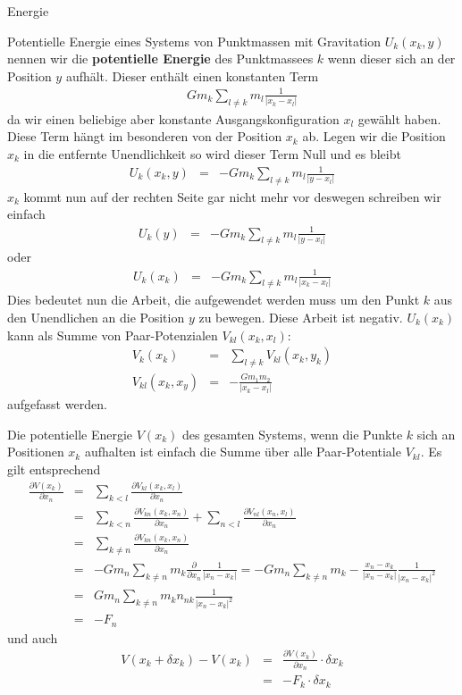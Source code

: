 \begin{chapter}{\titlestr}
\begin{section}{Energie}
\begin{subsection}{Potentielle Energie eines Systems von Punktmassen mit Gravitation}
$U_k(x_k,y)$ nennen wir die \textbf{potentielle Energie} des Punktmassees $k$ wenn dieser sich an der Position $y$ aufhält.
Dieser enthält einen konstanten Term
\begin{eqnarray*}
&&Gm_k\sum_{l\ne k} m_l\frac{1}{|x_k-x_l|}
\end{eqnarray*}
da wir einen beliebige aber konstante Ausgangskonfiguration $x_l$ gewählt haben. Diese Term hängt im besonderen von der
Position $x_k$ ab. Legen wir die Position $x_k$ in die entfernte Unendlichkeit so wird dieser Term Null und es bleibt
\begin{eqnarray*}
U_k(x_k,y) &=& -Gm_k\sum_{l\ne k} m_l\frac{1}{|y-x_l|}
\end{eqnarray*}
$x_k$ kommt nun auf der rechten Seite gar nicht mehr vor deswegen schreiben wir einfach
\begin{eqnarray*}
U_k(y) &=& -Gm_k\sum_{l\ne k} m_l\frac{1}{|y-x_l|}
\end{eqnarray*}
oder
\begin{eqnarray*}
U_k(x_k) &=& -Gm_k\sum_{l\ne k} m_l\frac{1}{|x_k-x_l|}
\end{eqnarray*}
Dies bedeutet nun die Arbeit, die aufgewendet werden muss um den Punkt $k$ aus den Unendlichen an die Position $y$ zu bewegen.
Diese Arbeit ist negativ. $U_k(x_k)$ kann als Summe von Paar-Potenzialen $V_{kl}(x_k,x_l)$:
\begin{eqnarray*}
V_k(x_k) &=& \sum_{l\ne k} V_{kl}(x_k,y_k)\\
V_{kl}(x_k,x_y) &=& -\frac{Gm_1m_2}{|x_k-x_l|}
\end{eqnarray*}
aufgefasst werden.

Die potentielle Energie $V(x_k)$ des gesamten Systems, wenn die Punkte $k$ sich an Positionen $x_k$ aufhalten ist einfach die Summe
über alle Paar-Potentiale $V_{kl}$.
Es gilt entsprechend 
\begin{eqnarray*}
\frac{\partial V(x_k)}{\partial x_n} &=& \sum_{k<l}\frac{\partial V_{kl}(x_k,x_l)}{\partial x_n}\\
&=& \sum_{k<n}\frac{\partial V_{kn}(x_k,x_n)}{\partial x_n}+\sum_{n<l}\frac{\partial V_{nl}(x_n,x_l)}{\partial x_n}\\
&=& \sum_{k\ne n}\frac{\partial V_{kn}(x_k,x_n)}{\partial x_n}\\
&=& -Gm_n\sum_{k\ne n}m_k\frac{\partial }{\partial x_n}\frac{1}{|x_n-x_k|}
= -Gm_n\sum_{k\ne n}m_k-\frac{x_n-x_k}{|x_n-x_k|}\frac{1}{|x_n-x_k|^2}\\
&=& Gm_n\sum_{k\ne n}m_kn_{nk}\frac{1}{|x_n-x_k|^2}\\
&=& -F_n
\end{eqnarray*}
und auch
\begin{eqnarray*}
V(x_k+\delta x_k)-V(x_k) &=& \frac{\partial V(x_k)}{\partial x_n}\cdot \delta x_k\\
&=& -F_k\cdot \delta x_k
\end{eqnarray*}
\end{subsection}


\end{section}
\end{chapter}

